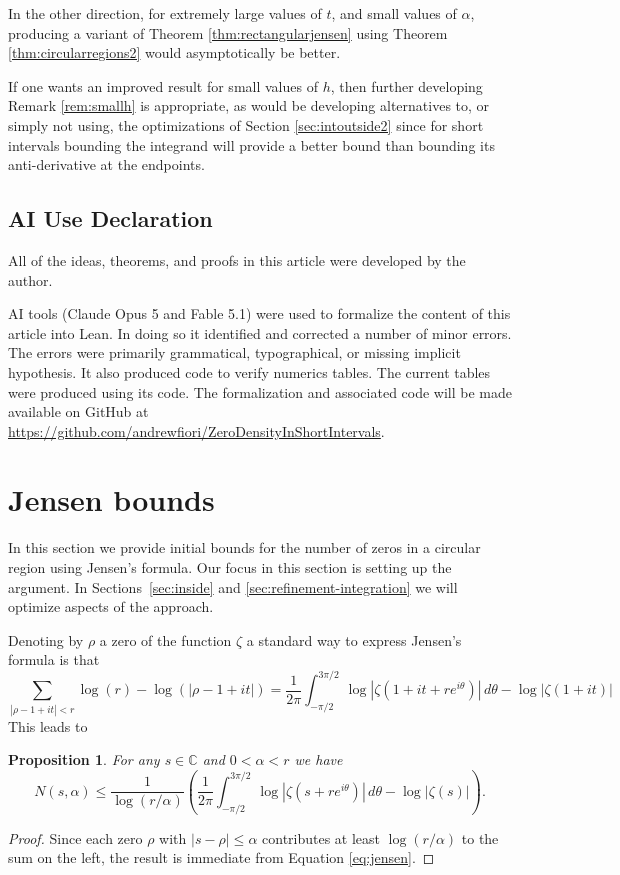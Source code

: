 \documentclass[10pt,english,letter, reqno]{amsart}
\theoremstyle{plain}
\newtheorem{proposition}[theorem]{Proposition}
\theoremstyle{definition}
\begin{document}
In the other direction, for extremely large values of $t$, and small values of $\alpha$, producing a variant of Theorem \ref{thm:rectangularjensen} using Theorem \ref{thm:circularregions2} would asymptotically be better. 

If one wants an improved result for small values of $h$, then further developing Remark \ref{rem:smallh} is appropriate, as would be developing alternatives to, or simply not using, the optimizations of Section \ref{sec:intoutside2} since for short intervals bounding the integrand will provide a better bound than bounding its anti-derivative at the endpoints.

\subsection{AI Use Declaration}

All of the ideas, theorems, and proofs in this article were developed by the author. 

AI tools (Claude Opus 5 and Fable 5.1) were used to formalize the content of this article into Lean. In doing so it identified and corrected a number of minor errors. The errors were primarily grammatical, typographical, or missing implicit hypothesis. It also produced code to verify numerics tables. The current tables were produced using its code. The formalization and associated code will be made available on GitHub at \url{https://github.com/andrewfiori/ZeroDensityInShortIntervals}.

\section{Jensen bounds}\label{sec:jensenclassic}

In this section we provide initial bounds for the number of zeros in a circular region using Jensen's formula. Our focus in this section is setting up the argument. In Sections~\ref{sec:inside} and \ref{sec:refinement-integration} we will optimize aspects of the approach.

Denoting by $\rho$ a zero of the function $\zeta$ a standard way to express 
Jensen's formula is that 
\begin{equation}\label{eq:jensen}
\sum_{|\rho - 1+it| < r}  \log(r) - \log(|\rho - 1+it|) = \frac{1}{2\pi}\int_{-\pi/2}^{3\pi/2} \log|\zeta(1+it+re^{i\theta})|\,d\theta - \log|\zeta(1+it)| 
\end{equation}
This leads to
\begin{proposition}\label{prop:jensenbound}
For any $s \in \mathbb{C}$ and $0<\alpha<r$ we have
\[  N(s,\alpha) \leq \frac{1}{\log(r/\alpha)} \left( \frac{1}{2\pi}\int_{-\pi/2}^{3\pi/2} \log|\zeta(s+re^{i\theta})|\,d\theta - \log|\zeta(s)|  \right).\]
\end{proposition}
\begin{proof}
    Since each zero $\rho$ with $|s-\rho|\leq\alpha$ contributes at least $\log(r/\alpha)$ to the sum on the left, the result is immediate from Equation \eqref{eq:jensen}.
\end{proof}
\end{document}
